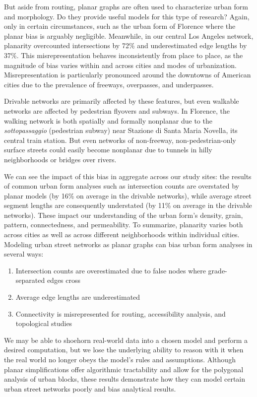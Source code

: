 \documentclass[Afour,sageh,times]{sagej}
\begin{document}
But aside from routing, planar graphs are often used to characterize urban form and morphology. Do they provide useful models for this type of research? Again, only in certain circumstances, such as the urban form of Florence where the planar bias is arguably negligible. Meanwhile, in our central Los Angeles network, planarity overcounted intersections by 72\% and underestimated edge lengths by 37\%. This misrepresentation behaves inconsistently from place to place, as the magnitude of bias varies within and across cities and modes of urbanization. Misrepresentation is particularly pronounced around the downtowns of American cities due to the prevalence of freeways, overpasses, and underpasses.

Drivable networks are primarily affected by these features, but even walkable networks are affected by pedestrian flyovers and subways. In Florence, the walking network is both spatially and formally nonplanar due to the \textit{sottopassaggio} (pedestrian subway) near Stazione di Santa Maria Novella, its central train station. But even networks of non-freeway, non-pedestrian-only surface streets could easily become nonplanar due to tunnels in hilly neighborhoods or bridges over rivers.

We can see the impact of this bias in aggregate across our study sites: the results of common urban form analyses such as intersection counts are overstated by planar models (by 16\% on average in the drivable networks), while average street segment lengths are consequently understated (by 11\% on average in the drivable networks). These impact our understanding of the urban form's density, grain, pattern, connectedness, and permeability. To summarize, planarity varies both across cities as well as across different neighborhoods within individual cities. Modeling urban street networks as planar graphs can bias urban form analyses in several ways:

\begin{enumerate}
	\item{Intersection counts are overestimated due to false nodes where grade-separated edges cross}
	\item{Average edge lengths are underestimated}
	\item{Connectivity is misrepresented for routing, accessibility analysis, and topological studies}
\end{enumerate}

We may be able to shoehorn real-world data into a chosen model and perform a desired computation, but we lose the underlying ability to reason with it when the real world no longer obeys the model's rules and assumptions. Although planar simplifications offer algorithmic tractability and allow for the polygonal analysis of urban blocks, these results demonstrate how they can model certain urban street networks poorly and bias analytical results.
\end{document}
